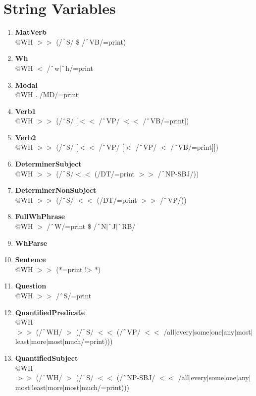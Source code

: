 \section{String Variables}
\begin{enumerate}
    \item \textbf{MatVerb}\\
    @WH $>\!\!>$ (/$\string^$S/ \$ /$\string^$VB/=print)

    \item \textbf{Wh}\\
    @WH $<$ /$\string^$w$|\string^$h/=print

    \item \textbf{Modal}\\
    @WH . /MD/=print

    \item \textbf{Verb1}\\
    @WH $>\!\!>$ (/$\string^$S/ [$<\!\!<$ /$\string^$VP/ $<\!\!<$ /$\string^$VB/=print])

    \item \textbf{Verb2}\\
    @WH $>\!\!>$ (/$\string^$S/ [$<\!\!<$ /$\string^$VP/ [$<$ /$\string^$VP/ $<$ /$\string^$VB/=print]])
    
    \item \textbf{DeterminerSubject}\\
    @WH $>\!\!>$ (/$\string^$S/$<\!\!<$ (/DT/=print $>\!\!>$ /$\string^$NP-SBJ/))
    
    \item \textbf{DeterminerNonSubject}\\
    @WH $>\!\!>$ (/$\string^$S/ $<\!\!<$ (/DT/=print $>\!\!>$ /$\string^$VP/))

    \item \textbf{FullWhPhrase}\\
    @WH $>$ /$\string^$W/=print \$ /$\string^$N$|\string^$J$|\string^$RB/

    \item \textbf{WhParse}

    \item \textbf{Sentence}\\
    @WH $>\!\!>$ (*=print !> *)

    \item \textbf{Question}\\
    @WH $>\!\!>$ /$\string^$S/=print

    \item \textbf{QuantifiedPredicate}\\
    @WH \\
    $>\!\!>$ (/$\string^$WH/ $>$ (/$\string^$S/ $<\!\!<$ (/$\string^$VP/ $<\!\!<$ /all$|$every$|$some$|$one$|$any$|$most$|$least$|$more$|$most$|$much/=print)))

    \item \textbf{QuantifiedSubject}\\
    @WH \\
    $>\!\!>$ (/$\string^$WH/ $>$ (/$\string^$S/ $<\!\!<$ (/$\string^$NP-SBJ/ $<\!\!<$ /all$|$every$|$some$|$one$|$any$|$most$|$least$|$more$|$most$|$much/=print)))

\end{enumerate}




